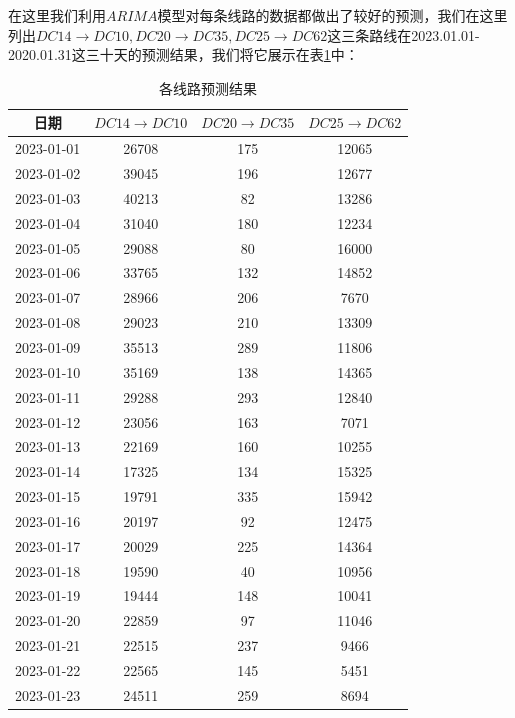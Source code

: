 \documentclass{MathorCupmodeling}
\begin{document}
在这里我们利用$ARIMA$模型对每条线路的数据都做出了较好的预测，我们在这里列出$DC14\to DC10,DC20\to DC35,DC25\to DC62$这三条路线在2023.01.01-2020.01.31这三十天的预测结果，我们将它展示在表\ref{a}中：
\begin{table}[h]
\centering
\caption{各线路预测结果}
\label{a}
\begin{tabular}{cccc}
\hline
日期 & $DC14\to DC10$ & $DC20\to DC35$ & $DC25\to DC62$ \\ \hline
2023-01-01             & 26708    & 175    & 12065     \\
2023-01-02             & 39045    & 196    & 12677    \\
2023-01-03             & 40213    & 82    & 13286    \\
2023-01-04             & 31040     & 180    & 12234    \\
2023-01-05             & 29088    & 80    & 16000   \\
2023-01-06             & 33765    & 132    & 14852    \\
2023-01-07             & 28966   & 206    & 7670    \\
2023-01-08             & 29023    & 210   & 13309    \\
2023-01-09             & 35513    & 289   & 11806    \\
2023-01-10             & 35169    & 138    & 14365    \\
2023-01-11             & 29288     & 293    & 12840    \\
2023-01-12             & 23056    & 163    & 7071    \\
2023-01-13             & 22169   & 160    & 10255    \\
2023-01-14             & 17325   & 134    & 15325    \\
2023-01-15             & 19791     & 335    & 15942    \\
2023-01-16             & 20197   & 92     & 12475    \\
2023-01-17             & 20029   & 225    & 14364    \\
2023-01-18             & 19590    & 40    & 10956    \\
2023-01-19             & 19444    & 148   & 10041    \\
2023-01-20             & 22859   & 97    & 11046    \\
2023-01-21             & 22515    & 237    & 9466     \\
2023-01-22             & 22565    & 145     & 5451    \\
2023-01-23             & 24511    & 259   & 8694    \\

\end{tabular}
\end{table}
\end{document}
